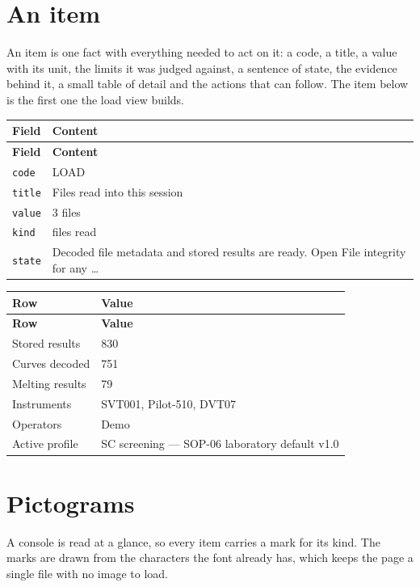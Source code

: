 \section{An item}
An item is one fact with everything needed to act on it: a code, a title, a value
with its unit, the limits it was judged against, a sentence of state, the evidence
behind it, a small table of detail and the actions that can follow. The item below
is the first one the load view builds.

{\small
\begin{longtable}{@{}ll@{}}
\toprule \textbf{Field} & \textbf{Content} \\\midrule\endfirsthead
\toprule \textbf{Field} & \textbf{Content} \\\midrule\endhead
\texttt{code} & LOAD \\
\texttt{title} & Files read into this session \\
\texttt{value} & 3 files \\
\texttt{kind} & files read \\
\texttt{state} & Decoded file metadata and stored results are ready. Open File integrity for any … \\
\bottomrule
\end{longtable}}

{\small
\begin{longtable}{@{}ll@{}}
\toprule \textbf{Row} & \textbf{Value} \\\midrule\endfirsthead
\toprule \textbf{Row} & \textbf{Value} \\\midrule\endhead
Stored results & 830 \\
Curves decoded & 751 \\
Melting results & 79 \\
Instruments & SVT001, Pilot-510, DVT07 \\
Operators & Demo \\
Active profile & SC screening — SOP-06 laboratory default v1.0 \\
\bottomrule
\end{longtable}}


\section{Pictograms}
A console is read at a glance, so every item carries a mark for its kind. The
marks are drawn from the characters the font already has, which keeps the page a
single file with no image to load.

